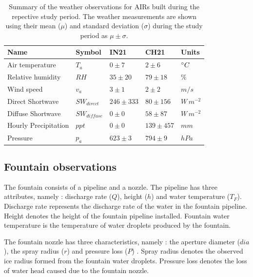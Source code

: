 \begin{table}
  \centering
  \caption{Summary of the weather observations for AIRs built during the repective study period. 
The weather measurements are shown using their mean ($\mu$) and standard deviation ($\sigma$) during the study
period as $\mu \pm \sigma$. }

	\label{tab:Observations}
	\begin{tabular}{|lllll|}
		\toprule
		\textbf{Name}               & \textbf{Symbol} & \textbf{IN21} & \textbf{CH21} & \textbf{Units}   \\ \midrule
		Air temperature             & $T_a    $       & $0 \pm 7$     & $2 \pm 6$     & $^{\circ} C$      \\
		Relative humidity           & $RH     $       & $35 \pm 20$   & $79 \pm 18$   & \%               \\
    Wind speed                  & $v_a        $   & $3 \pm 1$     & $2 \pm 2$     & $m/s$            \\
		Direct Shortwave            & $SW_{direct} $  & $246 \pm 333$ & $80 \pm 156$  & $W\,m^{-2}$      \\
		Diffuse Shortwave           & $SW_{diffuse}$  & $0 \pm 0$     & $58 \pm 87$   & $W\,m^{-2}$      \\
		Hourly Precipitation        & $ppt        $   & $0 \pm 0$     & $139 \pm 457$ & $mm$             \\
		Pressure                    & $p_a         $  & $623 \pm 3$   & $794 \pm 9$   & $hPa$            \\\bottomrule
	\end{tabular}
\end{table}

\subsection{Fountain observations}

The fountain consists of a pipeline and a nozzle. The pipeline has three attributes, namely : discharge rate
($Q$), height ($h$) and water temperature ($T_F$). Discharge rate represents the discharge rate of the water in
the fountain pipeline. Height denotes the height of the fountain pipeline installed. Fountain water temperature
is the temperature of water droplets produced by the fountain.

The fountain nozzle has three characteristics, namely : the aperture diameter ($dia$), the spray radius ($r$)
and pressure loss ($P$) . Spray radius denotes the observed ice radius formed from the fountain water droplets.
Pressure loss denotes the loss of water head caused due to the fountain nozzle.

